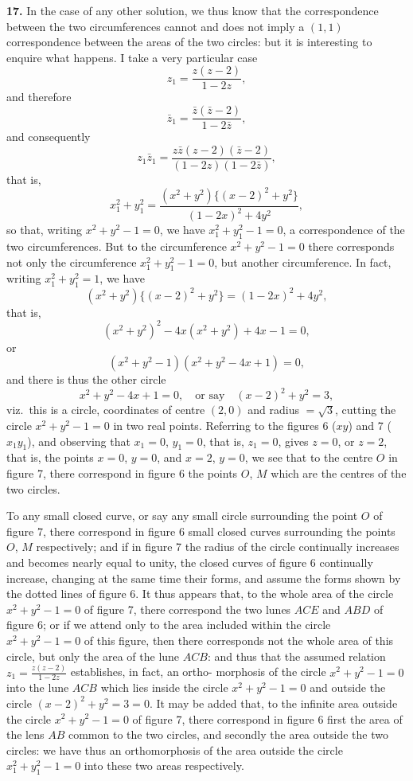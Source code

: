 \documentclass[12pt,a4paper]{article}
\begin{document}
\textbf{17.} In the case of any other solution, we thus know that the correspondence
between the two circumferences cannot and does not imply a $(1, 1)$ correspondence
between the areas of the two circles: but it is interesting to enquire what happens.
I take a very particular case
\[
z_1 = \frac{z(z-2)}{1-2z},
\]
and therefore
\[
\bar{z}_1 = \frac{\bar{z}(\bar{z}-2)}{1-2\bar{z}},
\]
and consequently
\[
z_1\bar{z}_1 = \frac{z\bar{z}(z-2)(\bar{z}-2)}{(1-2z)(1-2\bar{z})},
\]
that is,
\[
x_1^2 + y_1^2 = \frac{(x^2+y^2)\{(x-2)^2+y^2\}}{(1-2x)^2+4y^2},
\]
so that, writing $x^2 + y^2 - 1 = 0$, we have $x_1^2 + y_1^2 - 1 = 0$, a correspondence of the two
circumferences. But to the circumference $x^2 + y^2 - 1 = 0$ there corresponds not only
the circumference $x_1^2 + y_1^2 - 1 = 0$, but another circumference. In fact, writing $x_1^2 + y_1^2 = 1$,
we have
\[
(x^2+y^2)\{(x-2)^2+y^2\} = (1-2x)^2 + 4y^2,
\]
that is,
\[
(x^2+y^2)^2 - 4x(x^2+y^2) + 4x - 1 = 0,
\]
or
\[
(x^2+y^2-1)(x^2+y^2-4x+1) = 0,
\]
and there is thus the other circle
\[
x^2+y^2-4x+1 = 0, \quad \text{or say} \quad (x-2)^2 + y^2 = 3,
\]
viz.~this is a circle, coordinates of centre $(2, 0)$ and radius $= \sqrt{3}$, cutting the circle
$x^2 + y^2 - 1 = 0$ in two real points. Referring to the figures 6 ($xy$) and 7 ($x_1y_1$), and
observing that $x_1 = 0$, $y_1 = 0$, that is, $z_1 = 0$, gives $z = 0$, or $z = 2$, that is, the points
$x = 0$, $y = 0$, and $x = 2$, $y = 0$, we see that to the centre $O$ in figure 7, there
correspond in figure 6 the points $O$, $M$ which are the centres of the two circles.

To any small closed curve, or say any small circle surrounding the point $O$ of
figure 7, there correspond in figure 6 small closed curves surrounding the points
$O$, $M$ respectively; and if in figure 7 the radius of the circle continually increases
and becomes nearly equal to unity, the closed curves of figure 6 continually increase,
changing at the same time their forms, and assume the forms shown by the dotted
lines of figure 6. It thus appears that, to the whole area of the circle $x^2 + y^2 - 1 = 0$
of figure 7, there correspond the two lunes $ACE$ and $ABD$ of figure 6; or if we
attend only to the area included within the circle $x^2 + y^2 - 1 = 0$ of this figure, then
there corresponds not the whole area of this circle, but only the area of the lune
$ACB$: and thus that the assumed relation $z_1 = \frac{z(z-2)}{1-2z}$ establishes, in fact, an ortho-\allowbreak
morphosis of the circle $x^2 + y^2 - 1 = 0$ into the lune $ACB$ which lies inside the circle
$x^2 + y^2 - 1 = 0$ and outside the circle $(x - 2)^2 + y^2 = 3 = 0$. It may be added that, to
the infinite area outside the circle $x^2 + y^2 - 1 = 0$ of figure 7, there correspond in
figure 6 first the area of the lens $AB$ common to the two circles, and secondly the
area outside the two circles: we have thus an orthomorphosis of the area outside
the circle $x_1^2 + y_1^2 - 1 = 0$ into these two areas respectively.
\end{document}
